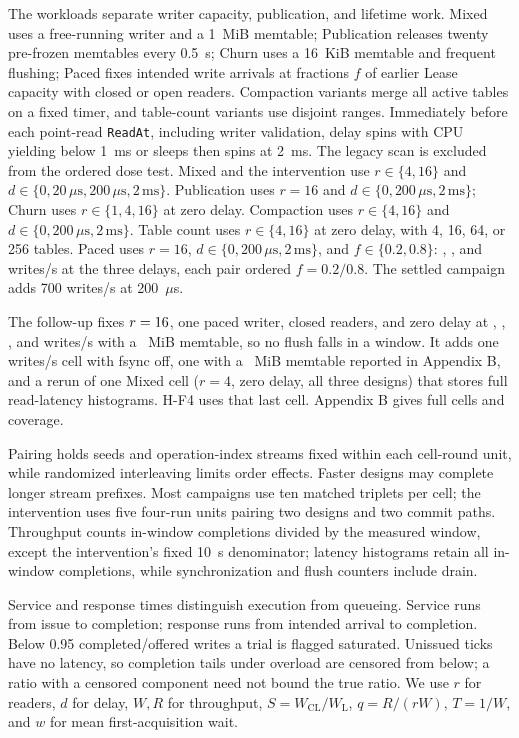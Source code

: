 \documentclass[conference]{IEEEtran}
\begin{document}
The workloads separate writer capacity, publication, and lifetime work. Mixed uses a free-running writer and a 1~MiB memtable; Publication releases twenty pre-frozen memtables every 0.5~s; Churn uses a 16~KiB memtable and frequent flushing; Paced fixes intended write arrivals at fractions $f$ of earlier Lease capacity with closed or open readers. Compaction variants merge all active tables on a fixed timer, and table-count variants use disjoint ranges. Immediately before each point-read \texttt{ReadAt}, including writer validation, delay spins with CPU yielding below 1~ms or sleeps then spins at 2~ms. The legacy scan is excluded from the ordered dose test. Mixed and the intervention use $r\in\{4, 16\}$ and $d\in\{0, 20\,\mu\mathrm{s},200\,\mu\mathrm{s},2\,\mathrm{ms}\}$. Publication uses $r=16$ and $d\in\{0, 200\,\mu\mathrm{s},2\,\mathrm{ms}\}$; Churn uses $r\in\{1, 4, 16\}$ at zero delay. Compaction uses $r\in\{4, 16\}$ and $d\in\{0, 200\,\mu\mathrm{s},2\,\mathrm{ms}\}$. Table count uses $r\in\{4, 16\}$ at zero delay, with 4, 16, 64, or 256 tables. Paced uses $r=16$, $d\in\{0, 200\,\mu\mathrm{s},2\,\mathrm{ms}\}$, and $f\in\{0.2, 0.8\}$: \PacedRatesZero{}, \PacedRatesMedium{}, and \PacedRatesHigh{} writes/s at the three delays, each pair ordered $f=0.2/0.8$. The settled campaign adds 700 writes/s at 200~$\mu$s.

The follow-up fixes $r=16{}$, one paced writer, closed readers, and zero delay at \FollowRateLow{}, \FollowRateSecond{}, \FollowRateThird{}, and \FollowRateHigh{} writes/s with a \FollowMemLarge{}~MiB memtable, so no flush falls in a window. It adds one \FollowRateHigh{} writes/s cell with fsync off, one with a \FollowMemSmall{}~MiB memtable reported in Appendix B, and a rerun of one Mixed cell ($r=4$, zero delay, all three designs) that stores full read-latency histograms. H-F4 uses that last cell. Appendix B gives full cells and coverage.

Pairing holds seeds and operation-index streams fixed within each cell-round unit, while randomized interleaving limits order effects. Faster designs may complete longer stream prefixes. Most campaigns use ten matched triplets per cell; the intervention uses five four-run units pairing two designs and two commit paths. Throughput counts in-window completions divided by the measured window, except the intervention's fixed 10~s denominator; latency histograms retain all in-window completions, while synchronization and flush counters include drain.

Service and response times distinguish execution from queueing. Service runs from issue to completion; response runs from intended arrival to completion. Below 0.95 completed/offered writes a trial is flagged saturated. Unissued ticks have no latency, so completion tails under overload are censored from below; a ratio with a censored component need not bound the true ratio. We use $r$ for readers, $d$ for delay, $W,R$ for throughput, $S=W_{\mathrm{CL}}/W_{\mathrm{L}}$, $q=R/(rW)$, $T=1/W$, and $w$ for mean first-acquisition wait.
\end{document}
